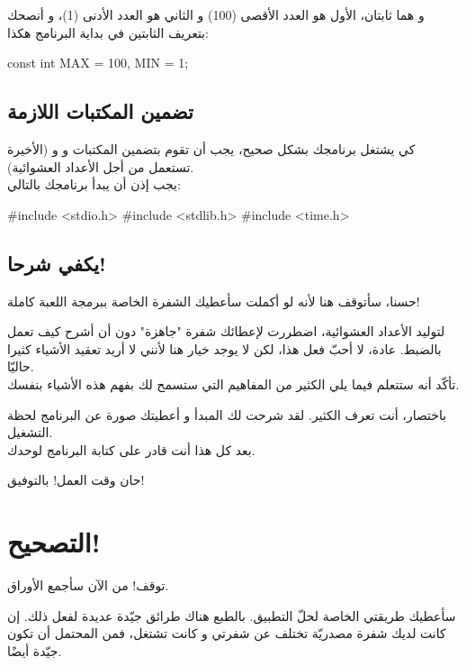 و 
هما ثابتان، الأول هو العدد الأقصى (100) و الثاني هو العدد الأدنى (1)، و أنصحك بتعريف الثابتين في بداية البرنامج هكذا:

\begin{Csource}
const int MAX = 100, MIN = 1;
\end{Csource}

\subsection{تضمين المكتبات اللازمة}

كي يشتغل برنامجك بشكل صحيح، يجب أن تقوم بتضمين المكتبات 
و 
و 
(الأخيرة تستعمل من أجل الأعداد العشوائية).\\
يجب إذن أن يبدأ برنامجك بالتالي:

\begin{Csource}
#include <stdio.h>
#include <stdlib.h>
#include <time.h>
\end{Csource}

\subsection{يكفي شرحا!}

حسنا، سأتوقف هنا لأنه لو أكملت سأعطيك الشفرة الخاصة ببرمجة اللعبة كاملة!

\begin{information}
لتوليد الأعداد العشوائية، اضطررت لإعطائك شفرة "جاهزة" دون أن أشرح كيف تعمل بالضبط. عادة، لا أحبّ فعل هذا، لكن لا يوجد خيار هنا لأنني لا أريد تعقيد الأشياء كثيرا حاليّا.\\
تأكّد أنه ستتعلم فيما يلي الكثير من المفاهيم التي ستسمح لك بفهم هذه الأشياء بنفسك.
\end{information}

باختصار، أنت تعرف الكثير. لقد شرحت لك المبدأ و أعطيتك صورة عن البرنامج لحظة التشغيل.\\
بعد كل هذا أنت قادر على كتابة البرنامج لوحدك.

حان وقت العمل! بالتوفيق!

\section{التصحيح!}
توقف! من الآن سأجمع الأوراق.

سأعطيك طريقتي الخاصة لحلّ التطبيق. بالطبع هناك طرائق جيّدة عديدة لفعل ذلك. إن كانت لديك شفرة مصدريّة تختلف عن شفرتي و كانت تشتغل، فمن المحتمل أن تكون جيّدة أيضًا.

